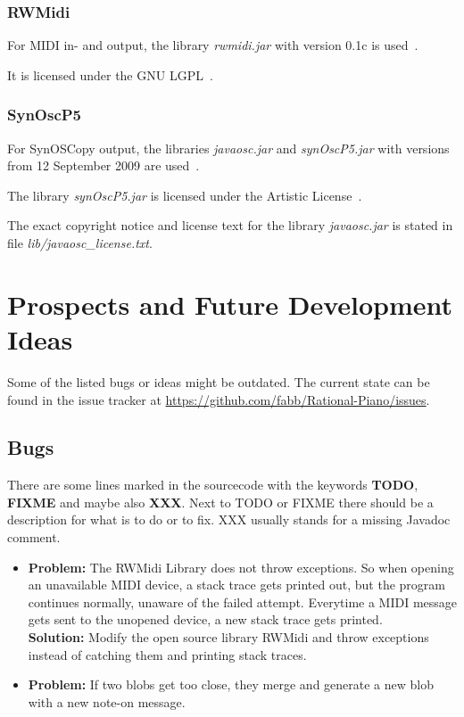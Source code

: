 \documentclass[12pt,a4paper,titlepage,oneside]{report}
\begin{document}
\subsection{RWMidi}

For MIDI in- and output, the library \emph{rwmidi.jar} with version 0.1c is used~\cite{bib:rwmidi}.

\noindent
It is licensed under the GNU LGPL~\cite{bib:lgpl}.


\subsection{SynOscP5}

For SynOSCopy output, the libraries \emph{javaosc.jar} and \emph{synOscP5.jar} with versions from 12 September 2009 are used~\cite{bib:synoscopy}.

\noindent
The library \emph{synOscP5.jar} is licensed under the Artistic License~\cite{bib:artistic}.

\noindent
The exact copyright notice and license text for the library \emph{javaosc.jar} is stated in file \emph{lib/javaosc\_license.txt}.


\chapter{Prospects and Future Development Ideas}
\label{chap:future}

Some of the listed bugs or ideas might be outdated. The current state can be found in the issue tracker at \url{https://github.com/fabb/Rational-Piano/issues}. 


\section{Bugs}

There are some lines marked in the sourcecode with the keywords \textbf{TODO}, \textbf{FIXME} and maybe also \textbf{XXX}. Next to TODO or FIXME there should be a description for what is to do or to fix. XXX usually stands for a missing Javadoc comment.

\begin{itemize}
	\item \textbf{Problem:} The RWMidi Library does not throw exceptions. So when opening an unavailable MIDI device, a stack trace gets printed out, but the program continues normally, unaware of the failed attempt. Everytime a MIDI message gets sent to the unopened device, a new stack trace gets printed. \\
	\textbf{Solution:} Modify the open source library RWMidi and throw exceptions instead of catching them and printing stack traces.

	\item \textbf{Problem:} If two blobs get too close, they merge and generate a new blob with a new note-on message.
\end{itemize}
\end{document}
